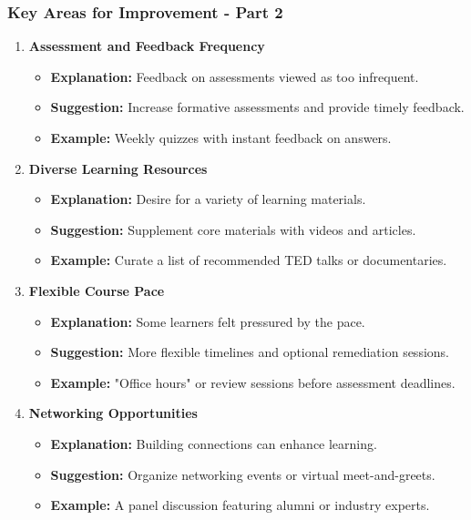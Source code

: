 \documentclass[aspectratio=169]{beamer}
\begin{document}
\begin{frame}[fragile]
    \frametitle{Key Areas for Improvement - Part 2}
    
    \begin{enumerate}[resume]
        \item \textbf{Assessment and Feedback Frequency}
        \begin{itemize}
            \item \textbf{Explanation:} Feedback on assessments viewed as too infrequent.
            \item \textbf{Suggestion:} Increase formative assessments and provide timely feedback.
            \item \textbf{Example:} Weekly quizzes with instant feedback on answers.
        \end{itemize}
        
        \item \textbf{Diverse Learning Resources}
        \begin{itemize}
            \item \textbf{Explanation:} Desire for a variety of learning materials.
            \item \textbf{Suggestion:} Supplement core materials with videos and articles.
            \item \textbf{Example:} Curate a list of recommended TED talks or documentaries.
        \end{itemize}
        
        \item \textbf{Flexible Course Pace}
        \begin{itemize}
            \item \textbf{Explanation:} Some learners felt pressured by the pace.
            \item \textbf{Suggestion:} More flexible timelines and optional remediation sessions.
            \item \textbf{Example:} "Office hours" or review sessions before assessment deadlines.
        \end{itemize}
        
        \item \textbf{Networking Opportunities}
        \begin{itemize}
            \item \textbf{Explanation:} Building connections can enhance learning.
            \item \textbf{Suggestion:} Organize networking events or virtual meet-and-greets.
            \item \textbf{Example:} A panel discussion featuring alumni or industry experts.
        \end{itemize}
    \end{enumerate}
\end{frame}
\end{document}
